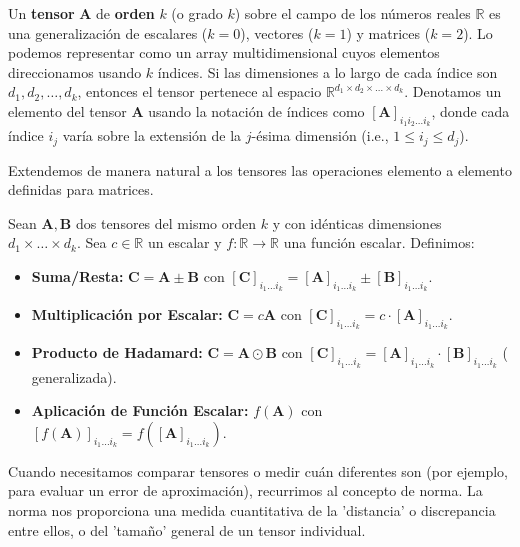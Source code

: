 \begin{definition}
Un \textbf{tensor} $\mathbf{A}$ de \textbf{orden} $k$ (o grado $k$) sobre el campo de los números reales $\mathbb{R}$ es una generalización de escalares ($k=0$), vectores ($k=1$) y matrices ($k=2$). Lo podemos representar como un array multidimensional cuyos elementos direccionamos usando $k$ índices. Si las dimensiones a lo largo de cada índice son $d_1, d_2, \dots, d_k$, entonces el tensor pertenece al espacio $\mathbb{R}^{d_1 \times d_2 \times \dots \times d_k}$. Denotamos un elemento del tensor $\mathbf{A}$ usando la notación de índices como $[\mathbf{A}]_{i_1 i_2 \dots i_k}$, donde cada índice $i_j$ varía sobre la extensión de la $j$-ésima dimensión (i.e., $1 \le i_j \le d_j$).
\end{definition}

Extendemos de manera natural a los tensores las operaciones elemento a elemento definidas para matrices.

\begin{definition}
Sean $\mathbf{A}, \mathbf{B}$ dos tensores del mismo orden $k$ y con idénticas dimensiones $d_1 \times \dots \times d_k$. Sea $c \in \mathbb{R}$ un escalar y $f: \mathbb{R} \to \mathbb{R}$ una función escalar. Definimos:
\begin{itemize}
    \item \textbf{Suma/Resta:} $\mathbf{C} = \mathbf{A} \pm \mathbf{B}$ con $[\mathbf{C}]_{i_1 \dots i_k} = [\mathbf{A}]_{i_1 \dots i_k} \pm [\mathbf{B}]_{i_1 \dots i_k}$.
    \item \textbf{Multiplicación por Escalar:} $\mathbf{C} = c\mathbf{A}$ con $[\mathbf{C}]_{i_1 \dots i_k} = c \cdot [\mathbf{A}]_{i_1 \dots i_k}$.
    \item \textbf{Producto de Hadamard:} $\mathbf{C} = \mathbf{A} \odot \mathbf{B}$ con $[\mathbf{C}]_{i_1 \dots i_k} = [\mathbf{A}]_{i_1 \dots i_k} \cdot [\mathbf{B}]_{i_1 \dots i_k}$ ( generalizada).
    \item \textbf{Aplicación de Función Escalar:} $f(\mathbf{A})$ con $[f(\mathbf{A})]_{i_1 \dots i_k} = f([\mathbf{A}]_{i_1 \dots i_k})$.
\end{itemize}
\end{definition}

Cuando necesitamos comparar tensores o medir cuán diferentes son (por ejemplo, para evaluar un error de aproximación), recurrimos al concepto de norma. La norma nos proporciona una medida cuantitativa de la 'distancia' o discrepancia entre ellos, o del 'tamaño' general de un tensor individual.

